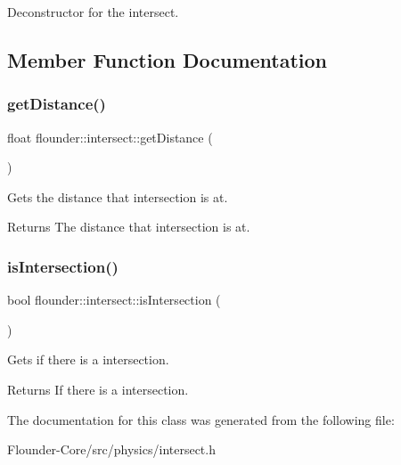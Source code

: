 Deconstructor for the intersect. 



\subsection{Member Function Documentation}
\mbox{\label{classflounder_1_1intersect_ab3f00d53d2614603bda044a43b27d679}} 
\subsubsection{\texorpdfstring{get\+Distance()}{getDistance()}}
{\footnotesize\ttfamily float flounder\+::intersect\+::get\+Distance (\begin{DoxyParamCaption}{ }\end{DoxyParamCaption})\hspace{0.3cm}{\ttfamily [inline]}}



Gets the distance that intersection is at. 

\begin{DoxyReturn}{Returns}
The distance that intersection is at. 
\end{DoxyReturn}
\mbox{\label{classflounder_1_1intersect_a680386b9684782d4b115ca380068ff3e}} 
\subsubsection{\texorpdfstring{is\+Intersection()}{isIntersection()}}
{\footnotesize\ttfamily bool flounder\+::intersect\+::is\+Intersection (\begin{DoxyParamCaption}{ }\end{DoxyParamCaption})\hspace{0.3cm}{\ttfamily [inline]}}



Gets if there is a intersection. 

\begin{DoxyReturn}{Returns}
If there is a intersection. 
\end{DoxyReturn}


The documentation for this class was generated from the following file\+:\begin{DoxyCompactItemize}
\item 
Flounder-\/\+Core/src/physics/intersect.\+h\end{DoxyCompactItemize}
